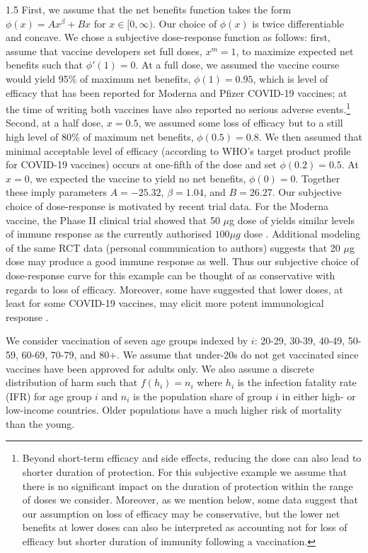 \documentclass[12pt]{article}
\begin{document}
\begin{spacing}{1.5}
First, we assume that the net benefits function takes the form
$\phi(x) = Ax^\beta + Bx$ for $x \in [0,\infty)$. Our choice of $\phi(x)$ is twice differentiable and concave. We chose a subjective dose-response function as follows: first, assume that vaccine developers set full doses, $x^m=1$, to maximize expected net benefits such that $\phi'(1)=0$. At a full dose, we assumed the vaccine course would yield 95\% of maximum net benefits, $\phi(1)=0.95$, which is level of efficacy that has been reported for Moderna and Pfizer COVID-19 vaccines; at the time of writing both vaccines have also reported no serious adverse events.\footnote{Beyond short-term efficacy and side effects, reducing the dose can also lead to shorter duration of protection. For this subjective example we assume that there is no significant impact on the duration of protection within the range of doses we consider. Moreover, as we mention below, some data suggest that our assumption on loss of efficacy may be conservative, but the lower net benefits at lower doses can also be interpreted as accounting not for loss of efficacy but shorter duration of immunity following a vaccination.}
Second, at a half dose, $x=0.5$, we assumed some loss of efficacy but to a still high level of 80\% of maximum net benefits, $\phi(0.5)=0.8$. We then assumed that minimal acceptable level of efficacy (according to WHO's target product profile for COVID-19 vaccines) occurs at one-fifth of the dose and set $\phi(0.2) = 0.5$. At $x=0$, we expected the vaccine to yield no net benefits, $\phi(0)=0$.  Together these imply parameters $A=-25.32$, $\beta = 1.04$, and $B=26.27$. Our subjective choice of dose-response is motivated by recent trial data. For the Moderna vaccine, the Phase II clinical trial showed that 50 $\mu$g dose of yields similar levels of immune response as the currently authorised $100 \mu g$ dose \cite{chu_preliminary_2021}. Additional modeling of the same RCT data (personal communication to authors) suggests that 20 $\mu$g dose may produce a good immune response as well. Thus our subjective choice of dose-response curve for this example can be thought of as conservative with regards to loss of efficacy. Moreover, some have suggested that lower doses, at least for some COVID-19 vaccines, may elicit more potent immunological response \cite{sanchez_limiting_2021}.

We consider vaccination of seven age groups indexed by $i$: 20-29, 30-39, 40-49, 50-59, 60-69, 70-79, and 80+. We assume that under-20s do not get vaccinated since vaccines have been approved for adults only. We also assume a discrete distribution of harm such that $f(h_i) = n_i$ where $h_i$ is the infection fatality rate (IFR) for age group $i$ and $n_i$ is the population share of group $i$ in either high- or low-income countries. Older populations have a much higher risk of mortality than the young.


\end{spacing}
\end{document}
